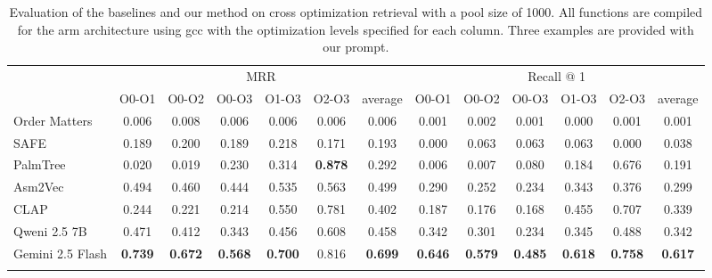 \documentclass[conference,compsoc]{IEEEtran}
\begin{document}
{
    \renewcommand{\arraystretch}{1.3}

    \begin{table}[!t]
    \centering
    \begin{tabular}{l|cccccc|cccccc}
    \Xhline{2\arrayrulewidth}
    \multirow{2}{*}{Model} & \multicolumn{6}{c|}{MRR}                                  & \multicolumn{6}{c}{Recall @ 1}                                                        \\ \cline{2-13}
                           & O0-O1     & O0-O2     & O0-O3     & O1-O3     & O2-O3     & average     & O0-O1     & O0-O2     & O0-O3     & O1-O3     & O2-O3     & average     \\ \hline
    Order Matters          & 0.006     & 0.008     & 0.006     & 0.006     & 0.006     & 0.006       & 0.001     & 0.002     & 0.001     & 0.000     & 0.001     & 0.001       \\
    SAFE                   & 0.189     & 0.200     & 0.189     & 0.218     & 0.171     & 0.193       & 0.000     & 0.063     & 0.063     & 0.063     & 0.000     & 0.038       \\
    PalmTree               & 0.020     & 0.019     & 0.230     & 0.314     & \bf 0.878 & 0.292       & 0.006     & 0.007     & 0.080     & 0.184     & 0.676     & 0.191       \\
    Asm2Vec                & 0.494     & 0.460     & 0.444     & 0.535     & 0.563     & 0.499       & 0.290     & 0.252     & 0.234     & 0.343     & 0.376     & 0.299       \\
    CLAP                   & 0.244     & 0.221     & 0.214     & 0.550     & 0.781     & 0.402       & 0.187     & 0.176     & 0.168     & 0.455     & 0.707     & 0.339       \\ \hline
    Qweni 2.5 7B           & 0.471     & 0.412     & 0.343     & 0.456     & 0.608     & 0.458       & 0.342     & 0.301     & 0.234     & 0.345     & 0.488     & 0.342       \\
    Gemini 2.5 Flash       & \bf 0.739 & \bf 0.672 & \bf 0.568 & \bf 0.700 & 0.816     & \bf 0.699   & \bf 0.646 & \bf 0.579 & \bf 0.485 & \bf 0.618 & \bf 0.758 & \bf 0.617   \\ \Xhline{2\arrayrulewidth}
    \end{tabular}
    \caption{Evaluation of the baselines and our method on cross optimization retrieval with a pool size of 1000.
    All functions are compiled for the arm architecture using gcc with the optimization levels specified for each column.
    Three examples are provided with our prompt.}
    \label{x-opt}
    \end{table}
}
\end{document}
